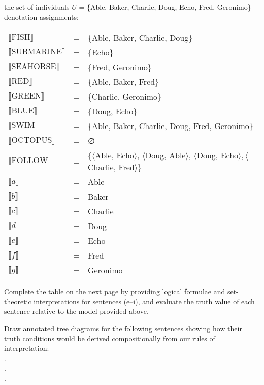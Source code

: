 {\ea the set of individuals $U$ = \{Able, Baker, Charlie, Doug, Echo, Fred, Geronimo\}
\tcbbreak\ex denotation assignments:\smallskip\\
  \begin{tabularx}{\linewidth}{@{} l@{~}c@{~}Q  @{}}
$\llbracket\text{FISH}\rrbracket$      & = & \{Able, Baker, Charlie, Doug\}\\
$\llbracket\text{SUBMARINE}\rrbracket$ & = & \{Echo\}\\
$\llbracket\text{SEAHORSE}\rrbracket$  & = & \{Fred, Geronimo\}\\
$\llbracket\text{RED}\rrbracket$       & = & \{Able, Baker, Fred\}\\
$\llbracket\text{GREEN}\rrbracket$     & = & \{Charlie, Geronimo\}\\
$\llbracket\text{BLUE}\rrbracket$      & = & \{Doug, Echo\}\\
$\llbracket\text{SWIM}\rrbracket$      & = & \{Able, Baker, Charlie, Doug, Fred, Geronimo\}\\
$\llbracket\text{OCTOPUS}\rrbracket$   & = & ∅\\
$\llbracket\text{FOLLOW}\rrbracket$  & = & \{$\langle$Able, Echo$\rangle$, $\langle$Doug, Able$\rangle$, $\langle$Doug, Echo$\rangle,\langle$Charlie, Fred$\rangle$\}\\ 
$\llbracket a\rrbracket$ & = & Able    \\
$\llbracket b\rrbracket$ & = & Baker   \\
$\llbracket c\rrbracket$ & = & Charlie \\
$\llbracket d\rrbracket$ & = & Doug\\
$\llbracket e\rrbracket$ & = & Echo\\
$\llbracket f\rrbracket$ & = & Fred\\ 
$\llbracket g\rrbracket$ & = & Geronimo\\
\end{tabularx}
    \z 
    
\ex  
    Complete the table on the next page by providing logical formulae and set-theoretic interpretations for sentences (e–i), and evaluate the truth value of each sentence relative to the model provided above.
\z 

\ea  
    Draw annotated tree diagrams for the following sentences showing how their truth conditions would be derived compositionally from our rules of interpretation:\\
.\\
.\\
.
                       \z
    \z

}
